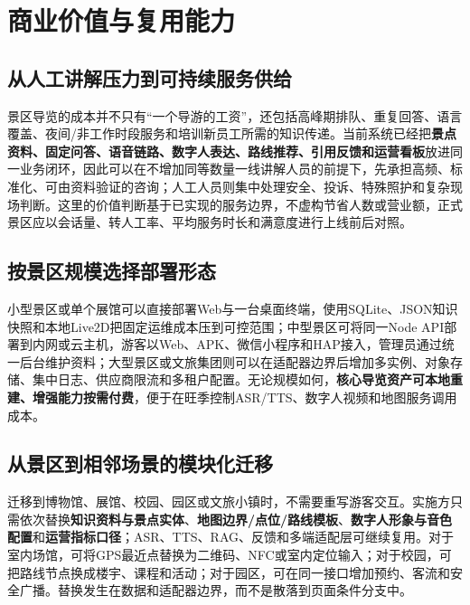 \section{商业价值与复用能力}

\subsection{从人工讲解压力到可持续服务供给}

景区导览的成本并不只有“一个导游的工资”，还包括高峰期排队、重复回答、语言覆盖、夜间/非工作时段服务和培训新员工所需的知识传递。当前系统已经把\textbf{景点资料、固定问答、语音链路、数字人表达、路线推荐、引用反馈和运营看板}放进同一业务闭环，因此可以在不增加同等数量一线讲解人员的前提下，先承担高频、标准化、可由资料验证的咨询；人工人员则集中处理安全、投诉、特殊照护和复杂现场判断。这里的价值判断基于已实现的服务边界，不虚构节省人数或营业额，正式景区应以会话量、转人工率、平均服务时长和满意度进行上线前后对照。

\subsection{按景区规模选择部署形态}

小型景区或单个展馆可以直接部署Web与一台桌面终端，使用SQLite、JSON知识快照和本地Live2D把固定运维成本压到可控范围；中型景区可将同一Node API部署到内网或云主机，游客以Web、APK、微信小程序和HAP接入，管理员通过统一后台维护资料；大型景区或文旅集团则可以在适配器边界后增加多实例、对象存储、集中日志、供应商限流和多租户配置。无论规模如何，\textbf{核心导览资产可本地重建、增强能力按需付费}，便于在旺季控制ASR/TTS、数字人视频和地图服务调用成本。

\subsection{从景区到相邻场景的模块化迁移}

迁移到博物馆、展馆、校园、园区或文旅小镇时，不需要重写游客交互。实施方只需依次替换\textbf{知识资料与景点实体}、\textbf{地图边界/点位/路线模板}、\textbf{数字人形象与音色配置}和\textbf{运营指标口径}；ASR、TTS、RAG、反馈和多端适配层可继续复用。对于室内场馆，可将GPS最近点替换为二维码、NFC或室内定位输入；对于校园，可把路线节点换成楼宇、课程和活动；对于园区，可在同一接口增加预约、客流和安全广播。替换发生在数据和适配器边界，而不是散落到页面条件分支中。

